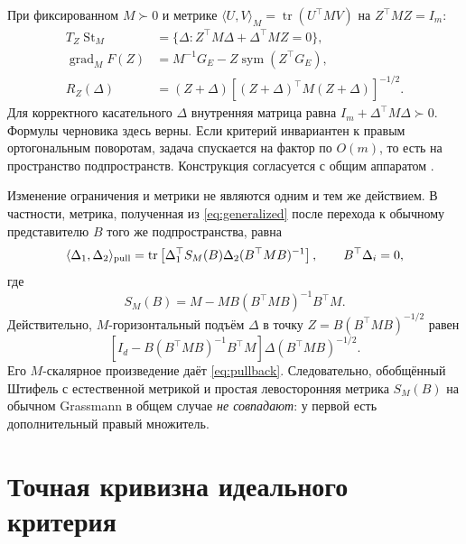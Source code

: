\documentclass[11pt,a4paper]{article}
\newcommand{\tr}{\operatorname{tr}}
\newcommand{\sym}{\operatorname{sym}}
\newcommand{\grad}{\operatorname{grad}}
\theoremstyle{remark}
\begin{document}
При фиксированном $M\succ0$ и метрике
$\langle U,V\rangle_M=\tr(U^\top MV)$ на $Z^\top MZ=I_m$:
\begin{align}\label{eq:generalized}
 T_Z\operatorname{St}_M&=\{\Delta:Z^\top M\Delta+\Delta^\top MZ=0\},\nonumber\\
 \grad_MF(Z)&=M^{-1}G_E-Z\sym(Z^\top G_E),\nonumber\\
 R_Z(\Delta)&=(Z+\Delta)
 [(Z+\Delta)^\top M(Z+\Delta)]^{-1/2}.
\end{align}
Для корректного касательного $\Delta$ внутренняя матрица равна
$I_m+\Delta^\top M\Delta\succ0$. Формулы черновика здесь верны.
Если критерий инвариантен к правым ортогональным поворотам, задача
спускается на фактор по $O(m)$, то есть на пространство подпространств.
Конструкция согласуется с общим аппаратом \cite{shustin}.

Изменение ограничения и метрики не являются одним и тем же действием.
В частности, метрика, полученная из \eqref{eq:generalized} после
перехода к обычному представителю $B$ того же подпространства, равна
\begin{equation}\label{eq:pullback}
 \langle\Delta_1,\Delta_2\rangle_{\rm pull}
 =\tr\left[\Delta_1^\top S_M(B)\Delta_2(B^\top MB)^{-1}\right],
 \qquad B^\top\Delta_i=0,
\end{equation}
где
\begin{equation}\label{eq:schur}
 S_M(B)=M-MB(B^\top MB)^{-1}B^\top M.
\end{equation}
Действительно, $M$-горизонтальный подъём $\Delta$ в точку
$Z=B(B^\top MB)^{-1/2}$ равен
\[
 [I_d-B(B^\top MB)^{-1}B^\top M]\Delta(B^\top MB)^{-1/2}.
\]
Его $M$-скалярное произведение даёт \eqref{eq:pullback}.
Следовательно, обобщённый Штифель с естественной метрикой и простая
левосторонняя метрика $S_M(B)$ на обычном Grassmann в общем случае
\emph{не совпадают}: у первой есть дополнительный правый множитель.

\section{Точная кривизна идеального критерия}
\end{document}
